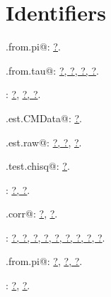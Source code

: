 \documentclass[reqno]{amsart}
\renewcommand{\NWlink}[2]{\hyperlink{#1}{#2}}
\begin{document}
\section{Identifiers}


{\small\begin{list}{}{\setlength{\itemsep}{-\parsep}\setlength{\itemindent}{-\leftmargin}}
\item \verb@corr.from.pi@: \underline{\NWlink{nuweb?}{?}}.
\item \verb@corr.from.tau@: \underline{\NWlink{nuweb?}{?}}\NWlink{nuweb?}{, ?}\NWlink{nuweb?}{, ?}\NWlink{nuweb?}{, ?}.
\item \verb@Marginals@: \NWlink{nuweb?}{?}, \underline{\NWlink{nuweb?}{?}}\NWlink{nuweb?}{, ?}.
\item \verb@mc.est.CMData@: \underline{\NWlink{nuweb?}{?}}.
\item \verb@mc.est.raw@: \NWlink{nuweb?}{?}\NWlink{nuweb?}{, ?}, \underline{\NWlink{nuweb?}{?}}.
\item \verb@mc.test.chisq@: \underline{\NWlink{nuweb?}{?}}.
\item \verb@mChoose@: \underline{\NWlink{nuweb?}{?}}\NWlink{nuweb?}{, ?}.
\item \verb@multi.corr@: \NWlink{nuweb?}{?}, \underline{\NWlink{nuweb?}{?}}.
\item \verb@tau@: \underline{\NWlink{nuweb?}{?}}\NWlink{nuweb?}{, ?}\NWlink{nuweb?}{, ?}\NWlink{nuweb?}{, ?}\NWlink{nuweb?}{, ?}\NWlink{nuweb?}{, ?}\NWlink{nuweb?}{, ?}\NWlink{nuweb?}{, ?}\NWlink{nuweb?}{, ?}.
\item \verb@tau.from.pi@: \NWlink{nuweb?}{?}, \underline{\NWlink{nuweb?}{?}}\NWlink{nuweb?}{, ?}.
\item \verb@uniprobs@: \NWlink{nuweb?}{?}, \underline{\NWlink{nuweb?}{?}}.
\end{list}}
\end{document}
